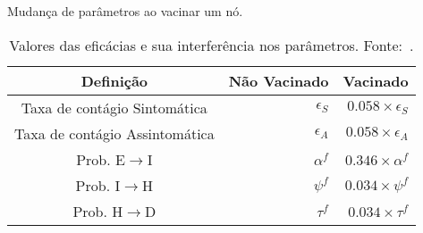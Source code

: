 \begin{table}[H]
    \captionsetup{width=13.5cm}
    \caption{Mudança de parâmetros ao vacinar um nó.}
    \centering
    \begin{tabular}{crr}
        \toprule
        Definição & Não Vacinado & Vacinado  \\
        \midrule
        \midrule
        Taxa de contágio Sintomática & \(\epsilon_S\) & \(0.058 \times \epsilon_S\)\\
        Taxa de contágio Assintomática & \(\epsilon_A\) & \(0.058 \times \epsilon_A\)\\
        Prob. E\(\rightarrow\)I & \(\alpha^f\) & \(0.346 \times \alpha^f\)\\
        Prob. I\(\rightarrow\)H & \(\psi^f\) & \(0.034 \times \psi^f\) \\
        Prob. H\(\rightarrow\)D & \(\tau^f\) & \(0.034 \times \tau^f\)\\
        \bottomrule
    \end{tabular}
    \caption*{Valores das eficácias e sua interferência nos parâmetros. Fonte:~\cite{Haas2021}.}
    \label{tabela:vacina_adaptada}
\end{table}

